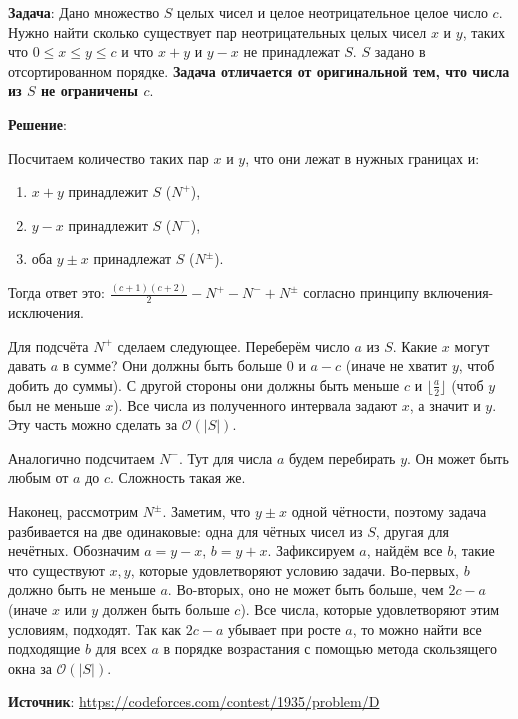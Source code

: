 \documentclass{article} %
\begin{document}
\textbf{Задача}: Дано множество $S$ целых чисел и целое неотрицательное целое число $c$. Нужно найти сколько существует пар неотрицательных целых чисел $x$ и $y$, таких что $0 \leqslant x \leqslant y \leqslant c$ и что $x+y$ и $y-x$ не принадлежат $S$. $S$ задано в отсортированном порядке. \textbf{Задача отличается от оригинальной тем, что числа из $S$ не ограничены $c$}.

\clearpage

\textbf{Решение}: 

Посчитаем количество таких пар $x$ и $y$, что они лежат в нужных границах и:
\begin{enumerate}
  \item $x+y$ принадлежит $S$ ($N^{+}$),
  \item $y-x$ принадлежит $S$ ($N^{-}$),
  \item оба $y \pm x$ принадлежат $S$ ($N^{\pm}$).
\end{enumerate}

Тогда ответ это: $\frac{(c + 1) (c + 2)}{2} - N^{+} - N^{-} + N^{\pm}$ согласно принципу включения-исключения.

Для подсчёта $N^{+}$ сделаем следующее. Переберём число $a$ из $S$. Какие $x$ могут давать $a$ в сумме? Они должны быть больше $0$ и $a - c$ (иначе не хватит $y$, чтоб добить до суммы). С другой стороны они должны быть меньше $c$ и $\lfloor \frac{a}{2} \rfloor$ (чтоб $y$ был не меньше $x$). Все числа из полученного интервала задают $x$, а значит и $y$. Эту часть можно сделать за $\mathcal{O}(|S|)$.

Аналогично подсчитаем $N^{-}$. Тут для числа $a$ будем перебирать $y$. Он может быть любым от $a$ до $c$. Сложность такая же.

Наконец, рассмотрим $N^{\pm}$. Заметим, что $y \pm x$ одной чётности, поэтому задача разбивается на две одинаковые: одна для чётных чисел из $S$, другая для нечётных. Обозначим $a = y - x$, $b = y + x$. Зафиксируем $a$, найдём все $b$, такие что существуют $x, y$, которые удовлетворяют условию задачи. Во-первых, $b$ должно быть не меньше $a$. Во-вторых, оно не может быть больше, чем $2c - a$ (иначе $x$ или $y$ должен быть больше $c$). Все числа, которые удовлетворяют этим условиям, подходят. Так как $2c - a$ убывает при росте $a$, то можно найти все подходящие $b$ для всех $a$ в порядке возрастания с помощью метода скользящего окна за $\mathcal{O}(|S|)$.  



\textbf{Источник}: \url{https://codeforces.com/contest/1935/problem/D}
\end{document}
